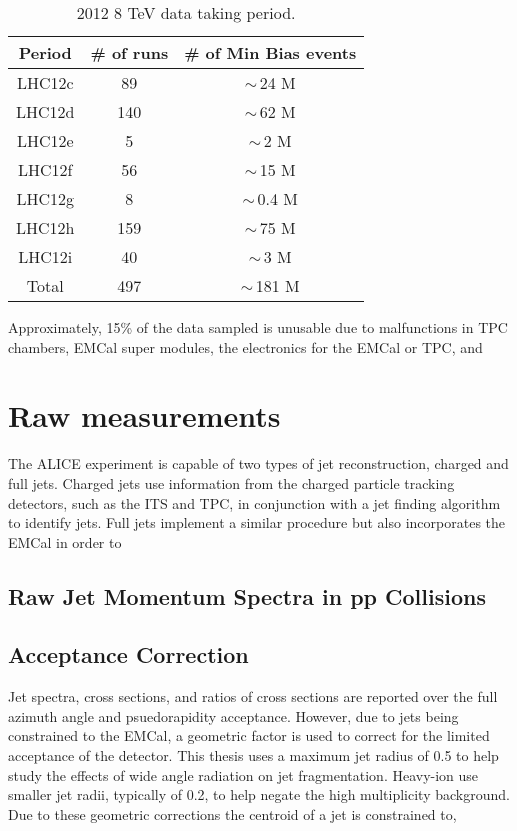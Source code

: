 \begin{table}[hb]
\label{tab:RunSummary}
\begin{center}
\begin{tabular}[b]{|c|c|c|}
	\hline
	Period & \# of runs & \# of Min Bias events \\ \hline
	LHC12c & 89 & $\sim \,$24 M \\ \hline
	LHC12d & 140 & $\sim \,$62 M \\ \hline
	LHC12e & 5 & $\sim \,$2 M \\ \hline
	LHC12f & 56 & $\sim \,$15 M \\ \hline
	LHC12g & 8 & $\sim \,$0.4 M \\ \hline
	LHC12h & 159 & $\sim \,$75 M \\ \hline
	LHC12i & 40 & $\sim \,$3 M \\ \hline
	Total & 497 & $\sim \,$181 M \\ \hline

\end{tabular}
\end{center}
\caption{2012 8 TeV data taking period.}
\end{table}

Approximately, 15\% of the data sampled is unusable due to malfunctions in TPC chambers, EMCal super modules, the electronics for the EMCal or TPC, and   
\section{Raw measurements}
The ALICE experiment is capable of two types of jet reconstruction, charged and full jets.  Charged jets use information from the charged particle tracking detectors, such as the ITS and TPC, in conjunction with a jet finding algorithm to identify jets.  Full jets implement a similar procedure but also incorporates the EMCal in order to 

\subsection{Raw Jet Momentum Spectra in pp Collisions}

\subsection{Acceptance Correction}
Jet spectra, cross sections, and ratios of cross sections are reported over the full azimuth angle and psuedorapidity acceptance.  However, due to jets being constrained to the EMCal, a geometric factor is used to correct for the limited acceptance of the detector.  This thesis uses a maximum jet radius of 0.5 to help study the effects of wide angle radiation on jet fragmentation.  Heavy-ion use smaller jet radii, typically of 0.2, to help negate the high multiplicity background.  Due to these geometric corrections the centroid of a jet is constrained to,

